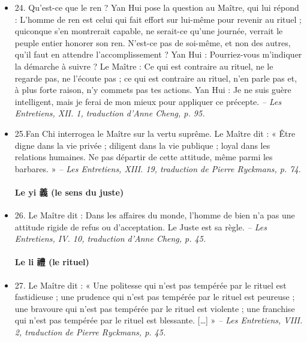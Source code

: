 \begin{itemize}
\item 24. \newline Qu’est-ce que le ren ? Yan Hui pose la question au Maître, qui lui répond : \newline L’homme de ren est celui qui fait effort sur lui-même pour revenir au rituel ; quiconque s’en montrerait capable, ne serait-ce qu’une journée, verrait le peuple entier honorer son ren. N’est-ce pas de soi-même, et non des autres, qu’il faut en attendre l’accomplissement ? \newline Yan Hui : Pourriez-vous m’indiquer la démarche à suivre ? \newline Le Maître : Ce qui est contraire au rituel, ne le regarde pas, ne l’écoute pas ; ce qui est contraire au rituel, n’en parle pas et, à plus forte raison, n’y commets pas tes actions. Yan Hui : Je ne suis guère intelligent, mais je ferai de mon mieux pour appliquer ce précepte. \textit{\small -- Les Entretiens, XII. 1, traduction d’Anne Cheng, p. 95.  }
\item 25.\newline Fan Chi interrogea le Maître sur la vertu suprême. \newline Le Maître dit : « Être digne dans la vie privée ; diligent dans la vie publique ; loyal dans les relations humaines. Ne pas départir de cette attitude, même parmi les barbares. » \textit{\small -- Les Entretiens, XIII. 19, traduction de Pierre Ryckmans, p. 74.  }
\paragraph{Le yi 義 (le sens du juste)}  
\item 26. \newline Le Maître dit : Dans les affaires du monde, l’homme de bien n’a pas une attitude rigide de refus ou d’acceptation. Le Juste est sa règle. \textit{\small -- Les Entretiens, IV. 10, traduction d’Anne Cheng, p. 45. } 

\paragraph{Le li 禮 (le rituel)}   

\item 27. \newline Le Maître dit : « Une politesse qui n’est pas tempérée par le rituel est fastidieuse ; une prudence qui n’est pas tempérée par le rituel est peureuse ; une bravoure qui n’est pas tempérée par le rituel est violente ; une franchise qui n’est pas tempérée par le rituel est blessante. […] » \textit{\small -- Les Entretiens, VIII. 2, traduction de Pierre Ryckmans, p. 45.  }


\end{itemize}
